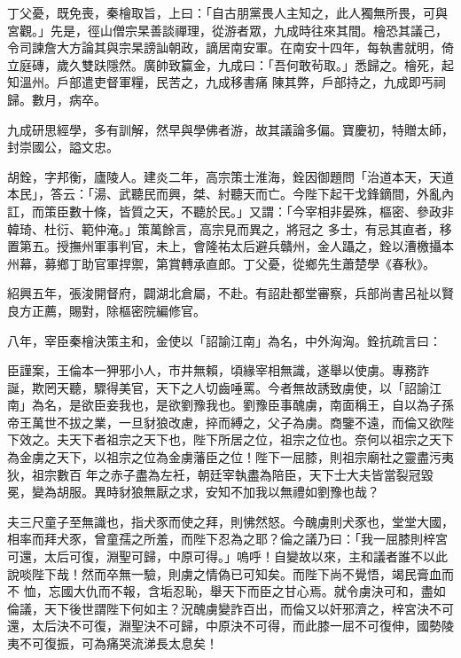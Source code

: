 \begin{pinyinscope}
 丁父憂，既免喪，秦檜取旨，上曰：「自古朋黨畏人主知之，此人獨無所畏，可與宮觀。」先是，徑山僧宗杲善談禪理，從游者眾，九成時往來其間。檜恐其議己，令司諫詹大方論其與宗杲謗訕朝政，謫居南安軍。在南安十四年，每執書就明，倚立庭磚，歲久雙趺隱然。廣帥致籯金，九成曰：「吾何敢茍取。」悉歸之。檜死，起知溫州。戶部遣吏督軍糧，民苦之，九成移書痛
 陳其弊，戶部持之，九成即丐祠歸。數月，病卒。



 九成研思經學，多有訓解，然早與學佛者游，故其議論多偏。寶慶初，特贈太師，封崇國公，謚文忠。



 胡銓，字邦衡，廬陵人。建炎二年，高宗策士淮海，銓因御題問「治道本天，天道本民」，答云：「湯、武聽民而興，桀、紂聽天而亡。今陛下起干戈鋒鏑間，外亂內訌，而策臣數十條，皆質之天，不聽於民。」又謂：「今宰相非晏殊，樞密、參政非韓琦、杜衍、範仲淹。」策萬餘言，高宗見而異之，將冠之
 多士，有忌其直者，移置第五。授撫州軍事判官，未上，會隆祐太后避兵贛州，金人躡之，銓以漕檄攝本州幕，募鄉丁助官軍捍禦，第賞轉承直郎。丁父憂，從鄉先生蕭楚學《春秋》。



 紹興五年，張浚開督府，闢湖北倉屬，不赴。有詔赴都堂審察，兵部尚書呂祉以賢良方正薦，賜對，除樞密院編修官。



 八年，宰臣秦檜決策主和，金使以「詔諭江南」為名，中外洶洶。銓抗疏言曰：



 臣謹案，王倫本一狎邪小人，市井無賴，頃緣宰相無識，遂舉以使虜。專務詐
 誕，欺罔天聽，驟得美官，天下之人切齒唾罵。今者無故誘致虜使，以「詔諭江南」為名，是欲臣妾我也，是欲劉豫我也。劉豫臣事醜虜，南面稱王，自以為子孫帝王萬世不拔之業，一旦豺狼改慮，捽而縛之，父子為虜。商鑒不遠，而倫又欲陛下效之。夫天下者祖宗之天下也，陛下所居之位，祖宗之位也。奈何以祖宗之天下為金虜之天下，以祖宗之位為金虜藩臣之位！陛下一屈膝，則祖宗廟社之靈盡污夷狄，祖宗數百
 年之赤子盡為左衽，朝廷宰執盡為陪臣，天下士大夫皆當裂冠毀冕，變為胡服。異時豺狼無厭之求，安知不加我以無禮如劉豫也哉？



 夫三尺童子至無識也，指犬豕而使之拜，則怫然怒。今醜虜則犬豕也，堂堂大國，相率而拜犬豕，曾童孺之所羞，而陛下忍為之耶？倫之議乃曰：「我一屈膝則梓宮可還，太后可復，淵聖可歸，中原可得。」嗚呼！自變故以來，主和議者誰不以此說啖陛下哉！然而卒無一驗，則虜之情偽已可知矣。而陛下尚不覺悟，竭民膏血而不
 恤，忘國大仇而不報，含垢忍恥，舉天下而臣之甘心焉。就令虜決可和，盡如倫議，天下後世謂陛下何如主？況醜虜變詐百出，而倫又以奸邪濟之，梓宮決不可還，太后決不可復，淵聖決不可歸，中原決不可得，而此膝一屈不可復伸，國勢陵夷不可復振，可為痛哭流涕長太息矣！




\end{pinyinscope}
